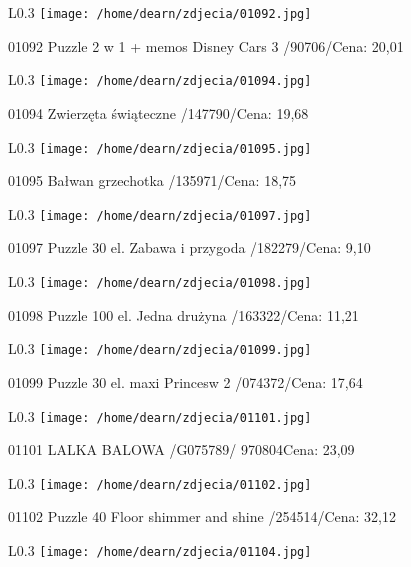\begin{wrapfigure}{L}{0.3\textwidth}
\texttt{[image: /home/dearn/zdjecia/01092.jpg]}
\end{wrapfigure}
01092 Puzzle 2 w 1 + memos Disney Cars 3 /90706/Cena: 20,01\newline
\begin{wrapfigure}{L}{0.3\textwidth}
\texttt{[image: /home/dearn/zdjecia/01094.jpg]}
\end{wrapfigure}
01094 Zwierzęta świąteczne /147790/Cena: 19,68\newline
\begin{wrapfigure}{L}{0.3\textwidth}
\texttt{[image: /home/dearn/zdjecia/01095.jpg]}
\end{wrapfigure}
01095 Bałwan grzechotka /135971/Cena: 18,75\newline
\begin{wrapfigure}{L}{0.3\textwidth}
\texttt{[image: /home/dearn/zdjecia/01097.jpg]}
\end{wrapfigure}
01097 Puzzle 30 el. Zabawa i przygoda /182279/Cena: 9,10\newline
\begin{wrapfigure}{L}{0.3\textwidth}
\texttt{[image: /home/dearn/zdjecia/01098.jpg]}
\end{wrapfigure}
01098 Puzzle 100 el. Jedna drużyna /163322/Cena: 11,21\newline
\begin{wrapfigure}{L}{0.3\textwidth}
\texttt{[image: /home/dearn/zdjecia/01099.jpg]}
\end{wrapfigure}
01099 Puzzle 30 el. maxi Princesw 2 /074372/Cena: 17,64\newline
\begin{wrapfigure}{L}{0.3\textwidth}
\texttt{[image: /home/dearn/zdjecia/01101.jpg]}
\end{wrapfigure}
01101 LALKA BALOWA  /G075789/                         970804Cena: 23,09\newline
\begin{wrapfigure}{L}{0.3\textwidth}
\texttt{[image: /home/dearn/zdjecia/01102.jpg]}
\end{wrapfigure}
01102 Puzzle 40 Floor shimmer and shine /254514/Cena: 32,12\newline
\begin{wrapfigure}{L}{0.3\textwidth}
\texttt{[image: /home/dearn/zdjecia/01104.jpg]}
\end{wrapfigure}
